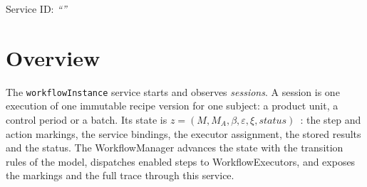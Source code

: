 \documentclass[a4paper]{arrowhead}
\begin{document}
\ArrowheadSetup

\begin{center}
  \vspace*{1cm}
  \huge{\arrowtitle}

  \vspace*{0.2cm}
  \LARGE{\arrowtype}
  \vspace*{1cm}

  \Large{Service ID: \textit{``\arrowid''}}
  \vspace*{\fill}

  

  \vspace*{1cm}
  \vspace*{\fill}

  \begin{abstract}
    This document describes the \texttt{workflow\allowbreak{}Instance} service of the Eclipse Arrowhead workflow support systems, which starts, observes and aborts workflow sessions. It is provided by the WorkflowManager system, service version 1.0.0, documentation edition 5.4.0.
  \end{abstract}

  \vspace*{1cm}
\end{center}

\newpage

\tableofcontents
\newpage

\section{Overview}
\label{sec:overview}
The \texttt{workflow\allowbreak{}Instance} service starts and observes \emph{sessions}. A session is one
execution of one immutable recipe version for one subject: a product unit, a control period or a batch. Its state is
$z = (M, M_A, \beta, \varepsilon, \xi, status)$~\cite{varga2026}: the step and action markings, the service bindings,
the executor assignment, the stored results and the status. The WorkflowManager advances the state with the transition
rules of the model, dispatches enabled steps to WorkflowExecutors, and exposes the markings and the full trace through
this service.
\end{document}
